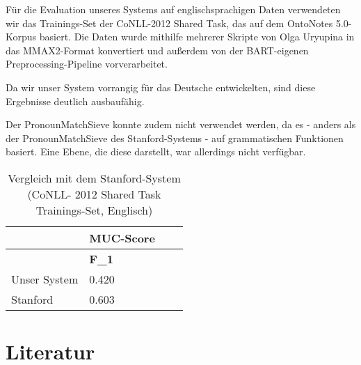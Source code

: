 \documentclass{scrartcl}
\begin{document}
Für die Evaluation unseres Systems auf englischsprachigen Daten verwendeten wir das Trainings-Set der CoNLL-2012 Shared Task, das auf dem OntoNotes 5.0-Korpus basiert. Die Daten wurde mithilfe mehrerer Skripte von Olga Uryupina in das MMAX2-Format konvertiert und außerdem von der BART-eigenen Preprocessing-Pipeline vorverarbeitet.

Da wir unser System vorrangig für das Deutsche entwickelten, sind diese Ergebnisse deutlich ausbaufähig.

Der PronounMatchSieve konnte zudem nicht verwendet werden, da es - anders als der PronounMatchSieve des Stanford-Systems - auf grammatischen Funktionen basiert. Eine Ebene, die diese darstellt, war allerdings nicht verfügbar. \\

\begin{table}[h]
\begin{tabular}{l||ll|l}
& \multicolumn{1}{c}{\textbf{MUC-Score}} \\ \hline
          &    \textbf{F\_1}    \\ \hline
Unser System &	  0.420  \\
Stanford   &	0.603
          
\end{tabular}
\caption{Vergleich mit dem Stanford-System (CoNLL- 2012 Shared Task Trainings-Set, Englisch)}
\label{tab:ml_vergleich}
\end{table}

\clearpage

\nocite{*}
\renewcommand*{\refname}{} %
\section{Literatur}  
{}

\end{document}
